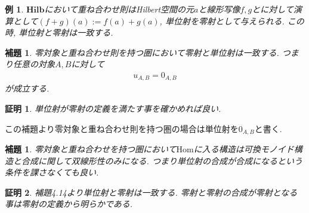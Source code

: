 \documentclass[a4paper,12pt]{ltjsarticle}
\theoremstyle{break}
\newtheorem{lem}[thm]{補題}
\newtheorem{eg}[thm]{例}
\newtheorem*{prf}{証明}
\newcommand{\hilb}{\mathbf{Hilb}}
\newcommand{\Hom}{\mathrm{Hom}}
\numberwithin{equation}{section}
\begin{document}
\begin{eg}
  $\hilb$において重ね合わせ則はHilbert空間の元$a$と線形写像$f,g$とに対して演算として$(f+g)(a):=f(a)+g(a)$, 単位射を零射として与えられる.  
  この時, 単位射と零射は一致する. 
\end{eg}  


\begin{lem}
  零対象と重ね合わせ則を持つ圏において零射と単位射は一致する. 
  つまり任意の対象$A,B$に対して
  \begin{align*}
    u_{A,B}=0_{A,B}
  \end{align*}
  が成立する. 
\end{lem}

\begin{prf}
  単位射が零射の定義を満たす事を確かめれば良い. 
\end{prf}

この補題より零対象と重ね合わせ則を持つ圏の場合は単位射を$0_{A,B}$と書く. 

\begin{lem}
  零対象と重ね合わせを持つ圏において$\Hom$に入る構造は可換モノイド構造と合成に関して双線形性のみになる. 
  つまり単位射の合成が合成になるという条件を課さなくても良い. 
\end{lem}  

\begin{prf}
  補題4.14より単位射と零射は一致する. 
  零射と零射の合成が零射となる事は零射の定義から明らかである. 
\end{prf}
\end{document}
